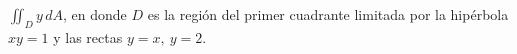 \item $\iint_D y \, dA$, en donde $D$ es la región del primer cuadrante limitada por la hipérbola $xy = 1$ y las rectas $y = x, \ y = 2$.
